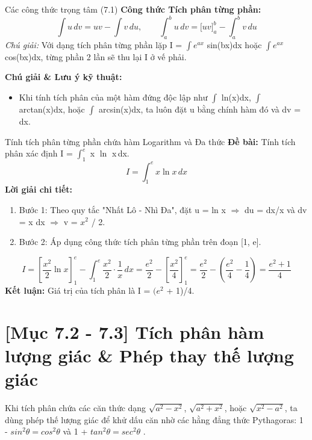 \documentclass[11pt,a4paper,oneside]{book}
\begin{document}
\begin{congthuc}{Các công thức trọng tâm (7.1)}
\noindent\textbf{Công thức Tích phân từng phần:}
\[ \int u\,dv = u v - \int v\,du, \qquad \int_a^b u\,dv = \Big[u v\Big]_a^b - \int_a^b v\,du \]
\noindent\textit{Chú giải:} Với dạng tích phân từng phần lặp I = $\int e^{ax}$ sin(bx)dx hoặc $\int e^{ax}$ cos(bx)dx, từng phần 2 lần sẽ thu lại I ở vế phải.\\[4pt]
\end{congthuc}

\noindent\textbf{Chú giải \& Lưu ý kỹ thuật:}
\begin{itemize}[leftmargin=1.5em, itemsep=2pt]
  \item Khi tính tích phân của một hàm đứng độc lập như $\int$ ln(x)dx, $\int$ arctan(x)dx, hoặc $\int$ arcsin(x)dx, ta luôn đặt u bằng chính hàm đó và dv = dx.
\end{itemize}

\begin{vidu}{Tính tích phân từng phần chứa hàm Logarithm và Đa thức}
\textbf{Đề bài:} Tính tích phân xác định I = $\int_1^e$ x $\ln$ x\,dx.
\[ I = \int_1^e x \ln x\,dx \]
\textbf{Lời giải chi tiết:}
\begin{enumerate}[leftmargin=1.5em, itemsep=2pt]
  \item Bước 1: Theo quy tắc "Nhất Lô - Nhì Đa", đặt u = ln x $\Rightarrow$  du = dx/x và dv = x dx $\Rightarrow$  v = $x^2$ / 2.
  \item Bước 2: Áp dụng công thức tích phân từng phần trên đoạn [1, e].
\end{enumerate}
\[ I = \left[ \frac{x^2}{2} \ln x \right]_1^e - \int_1^e \frac{x^2}{2} \cdot \frac{1}{x}\,dx = \frac{e^2}{2} - \left[\frac{x^2}{4}\right]_1^e = \frac{e^2}{2} - \left(\frac{e^2}{4} - \frac{1}{4}\right) = \frac{e^2 + 1}{4} \]
\noindent\textbf{Kết luận:} Giá trị của tích phân là I = $(e^2$ + 1)/4.
\end{vidu}

\section{[Mục 7.2 - 7.3] Tích phân hàm lượng giác \& Phép thay thế lượng giác}
Khi tích phân chứa các căn thức dạng $\sqrt{a^2 - x^2}$, $\sqrt{a^2 + x^2}$, hoặc $\sqrt{x^2 - a^2}$, ta dùng phép thế lượng giác để khử dấu căn nhờ các hằng đẳng thức Pythagoras: 1 - $sin^2 \theta = cos^2 \theta$  và 1 + $tan^2 \theta = sec^2 \theta$ .
\end{document}
